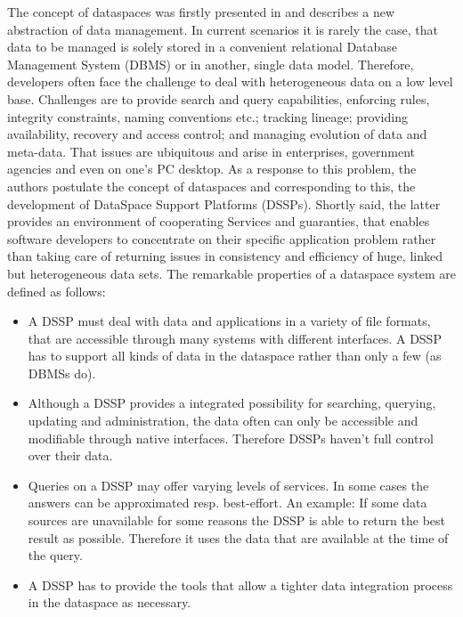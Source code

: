 The concept of dataspaces was firstly presented in \cite{Franklin:2005:DDN:1107499.1107502} and describes a new abstraction of data management. In current scenarios it is rarely the case, that data to be managed is solely stored in a convenient relational Database Management System (DBMS) or in another, single data model. Therefore, developers often face the challenge to deal with heterogeneous data on a low level base. Challenges are to provide search and query capabilities, enforcing rules, integrity constraints, naming conventions etc.; tracking lineage; providing availability, recovery and access control; and managing evolution of data and meta-data. That issues are ubiquitous and arise in enterprises, government agencies and even on one's PC desktop. 
As a response to this problem, the authors postulate the concept of dataspaces and corresponding to this, the  development of DataSpace Support Platforms (DSSPs). Shortly said, the latter provides an environment of cooperating Services and guaranties, that enables software developers to concentrate on their specific application problem rather than taking care of returning issues in consistency and efficiency of huge, linked but heterogeneous data sets. The remarkable properties of a dataspace system are defined as follows:

\begin{itemize}
\item A DSSP must deal with data and applications in a variety of file formats, that are accessible through many systems with different interfaces. A DSSP has to support all kinds of data in the dataspace rather than only a few (as DBMSs do).

\item Although a DSSP provides a integrated possibility for searching, querying, updating and administration, the data often can only be accessible and modifiable through native interfaces. Therefore DSSPs haven't full control over their data.

\item Queries on a DSSP may offer varying levels of services. In some cases the answers can be approximated resp. best-effort. An example: If some data sources are unavailable for some reasons the DSSP is able to return the best result as possible. Therefore it uses the data that are available at the time of the query.

\item A DSSP has to provide the tools that allow a tighter data integration process in the dataspace as necessary.
\end{itemize}


